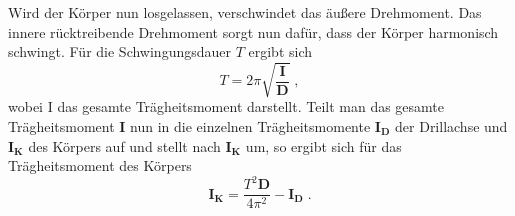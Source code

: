 Wird der Körper nun losgelassen, verschwindet das äußere Drehmoment. Das innere
rücktreibende Drehmoment sorgt nun dafür, dass der Körper harmonisch schwingt.
Für die Schwingungsdauer $T$ ergibt sich
\begin{equation}
  T=2\pi\sqrt{\frac{\symbf{I}}{\symbf{D}}}\;,
  \label{eqn:schwingung}
\end{equation}
wobei I das gesamte Trägheitsmoment darstellt. Teilt man das gesamte Trägheitsmoment
$\symbf{I}$ nun in die einzelnen Trägheitsmomente $\symbf{I_D}$ der Drillachse und
$\symbf{I_K}$ des Körpers auf und stellt nach $\symbf{I_K}$ um, so ergibt sich für
das Trägheitsmoment des Körpers
\begin{equation}
  \symbf{I_K}=\frac{T^2 \symbf{D}}{4\pi^2}-\symbf{I_D}\;.
  \label{eqn:traegheitschwingung}
\end{equation}
